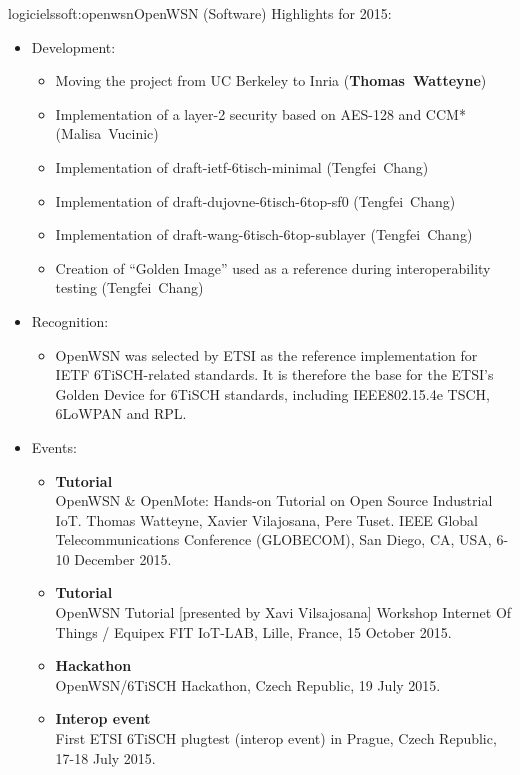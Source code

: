 \documentclass{ra2016}
\newcommand{\thomas}  {\textbf{Thomas~Watteyne}}
\begin{document}
\begin{module}{logiciels}{soft:openwsn}{OpenWSN (Software)}
Highlights for 2015:
\begin{itemize}
    \item Development:
        \begin{itemize}
            \item Moving the project from UC Berkeley to Inria (\thomas)
            \item Implementation of a layer-2 security based on AES-128 and CCM* (Malisa~Vucinic)
            \item Implementation of draft-ietf-6tisch-minimal (Tengfei~Chang)
            \item Implementation of draft-dujovne-6tisch-6top-sf0 (Tengfei~Chang)
            \item Implementation of draft-wang-6tisch-6top-sublayer (Tengfei~Chang)
            \item Creation of ``Golden Image'' used as a reference during interoperability testing (Tengfei~Chang)
        \end{itemize}
    \item Recognition:
        \begin{itemize}
            \item OpenWSN was selected by ETSI as the reference implementation for IETF 6TiSCH-related standards. It is therefore the base for the ETSI's Golden Device for 6TiSCH standards, including IEEE802.15.4e TSCH, 6LoWPAN and RPL.
        \end{itemize}
    \item Events:
        \begin{itemize}
            \item \textbf{Tutorial}\\
                OpenWSN \& OpenMote: Hands-on Tutorial on Open Source Industrial IoT. Thomas Watteyne, Xavier Vilajosana, Pere Tuset. IEEE Global Telecommunications Conference (GLOBECOM), San Diego, CA, USA, 6-10 December 2015.
            \item \textbf{Tutorial}\\
                OpenWSN Tutorial [presented by Xavi Vilsajosana] Workshop Internet Of Things / Equipex FIT IoT-LAB, Lille, France, 15 October 2015.
            \item \textbf{Hackathon}\\
                OpenWSN/6TiSCH Hackathon, Czech Republic, 19 July 2015.
            \item \textbf{Interop event}\\
                First ETSI 6TiSCH plugtest (interop event) in Prague, Czech Republic, 17-18 July 2015.
        \end{itemize}
\end{itemize}

\end{module}
\end{document}
